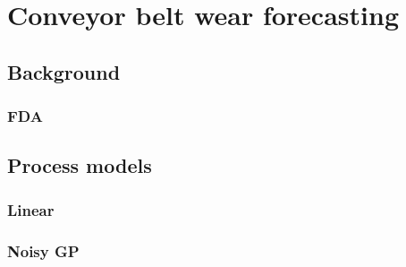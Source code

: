 \chapter{Conveyor belt wear forecasting}\label{chap:chapter6}

\section{Background}

\subsection{FDA}

\section{Process models}

\subsection{Linear}

\subsection{Noisy GP}

